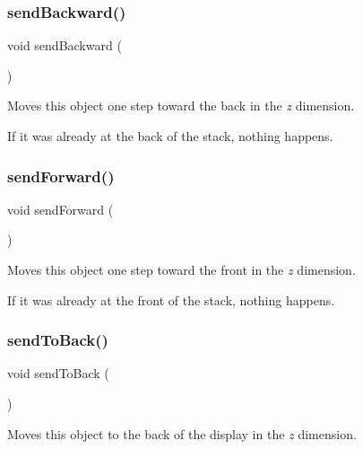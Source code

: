 \subsubsection{\texorpdfstring{send\+Backward()}{sendBackward()}}
{\footnotesize\ttfamily void send\+Backward (\begin{DoxyParamCaption}{ }\end{DoxyParamCaption})\hspace{0.3cm}{\ttfamily [inherited]}}



Moves this object one step toward the back in the {\itshape z} dimension. 

If it was already at the back of the stack, nothing happens. \mbox{\label{classGObject_a710b3e449c9facba7847c91ab170d281}} 
\subsubsection{\texorpdfstring{send\+Forward()}{sendForward()}}
{\footnotesize\ttfamily void send\+Forward (\begin{DoxyParamCaption}{ }\end{DoxyParamCaption})\hspace{0.3cm}{\ttfamily [inherited]}}



Moves this object one step toward the front in the {\itshape z} dimension. 

If it was already at the front of the stack, nothing happens. \mbox{\label{classGObject_a0f7f1efbb7fd46dde2867c4ad0330896}} 
\subsubsection{\texorpdfstring{send\+To\+Back()}{sendToBack()}}
{\footnotesize\ttfamily void send\+To\+Back (\begin{DoxyParamCaption}{ }\end{DoxyParamCaption})\hspace{0.3cm}{\ttfamily [inherited]}}



Moves this object to the back of the display in the {\itshape z} dimension. 

